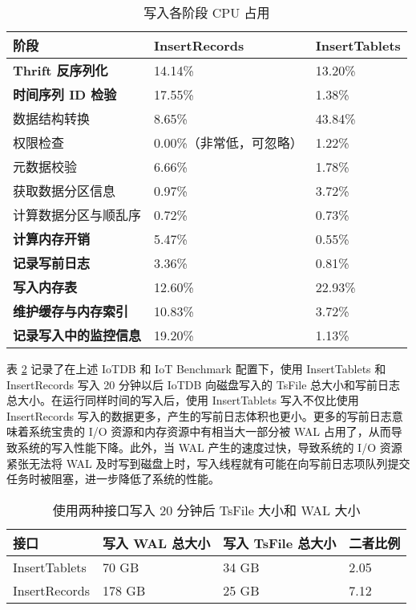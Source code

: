 \begin{table}
  \caption{写入各阶段 CPU 占用}
  \centering
  \begin{tabular}{lll}
  \toprule
  阶段 &  InsertRecords & InsertTablets \\
  \midrule
      \textbf{Thrift 反序列化} &  14.14\% & 13.20\% \\ 
      \textbf{时间序列 ID 检验} & 17.55\% & 1.38\% \\ 
      数据结构转换 &  8.65\% & 43.84\% \\ 
       权限检查 & 0.00\%（非常低，可忽略） &  1.22\%\\ 
      元数据校验 &  6.66\% & 1.78\% \\ 
      获取数据分区信息 &  0.97\% & 3.72\% \\
      计算数据分区与顺乱序 &  0.72\%&  0.73\%  \\
      \textbf{计算内存开销} & 5.47\% & 0.55\% \\
      \textbf{记录写前日志} & 3.36\% & 0.81\%\\
      \textbf{写入内存表} & 12.60\% & 22.93\% \\
      \textbf{维护缓存与内存索引} & 10.83\% & 3.72\% \\
      \textbf{记录写入中的监控信息} & 19.20\% & 1.13\%\\
  \bottomrule
  \end{tabular}
  \label{tabular:insert-records-profile-result}
\end{table}

表 \ref{tabular:wal-vs-tsfile-size} 记录了在上述 IoTDB 和 IoT Benchmark 配置下，使用 InsertTablets 和 InsertRecords 写入 20 分钟以后 IoTDB 向磁盘写入的 TsFile 总大小和写前日志总大小。在运行同样时间的写入后，使用 InsertTablets 写入不仅比使用 InsertRecords 写入的数据更多，产生的写前日志体积也更小。更多的写前日志意味着系统宝贵的 I/O 资源和内存资源中有相当大一部分被 WAL 占用了，从而导致系统的写入性能下降。此外，当 WAL 产生的速度过快，导致系统的 I/O 资源紧张无法将 WAL 及时写到磁盘上时，写入线程就有可能在向写前日志项队列提交任务时被阻塞，进一步降低了系统的性能。


\begin{table}
  \caption{使用两种接口写入 20 分钟后 TsFile 大小和 WAL 大小}
  \centering
  \begin{tabular}{llll}
  \toprule 
  接口 & 写入 WAL 总大小 & 写入 TsFile 总大小 & 二者比例 \\
  \midrule 
  InsertTablets &  70 GB & 34 GB &  2.05 \\
  InsertRecords & 178 GB & 25 GB & 7.12 \\
  \bottomrule
  \end{tabular}
  \label{tabular:wal-vs-tsfile-size}
\end{table}


